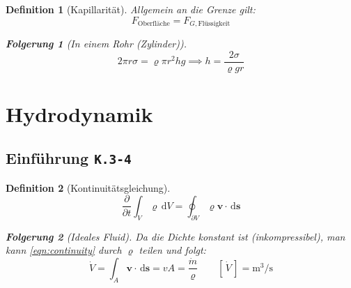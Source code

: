 \documentclass[a4paper, twocolumn]{article}
\numberwithin{equation}{section}
\theoremstyle{hsr-def}
\newtheorem{definition}{Definition}[section]
\theoremstyle{hsr-sub}
\newtheorem{result}{Folgerung}[definition]
\newtheorem{remark}{Bemerkung}[definition]
\newcommand{\dd}[1]{\ensuremath{\mathrm{d}#1}}
\newcommand{\di}[1]{\,\dd{#1}}
\newcommand{\pderiv}[2]{\ensuremath{\frac{\partial #1}{\partial #2}}}
\renewcommand{\vec}[1]{\ensuremath{\mathbf{#1}}}
\newcommand{\unitof}[1]{\ensuremath{\left[\,#1\,\right]}}
\newcommand{\fromlecture}[1]{\textcolor{red!70!black}{\small\texttt{K.#1}}}
\begin{document}
\begin{definition}[Kapillarit\"at]
Allgemein an die Grenze gilt:
\[
    F_\text{Oberfl\"ache} = F_{G,\text{Fl\"ussigkeit}}
\]
\begin{result}[In einem Rohr (Zylinder)]
\[
    2\pi r\sigma = \varrho\pi r^2 hg \implies  h = \frac{2\sigma}{\varrho g r}
\]
\end{result}
\end{definition}

\section{Hydrodynamik}
\subsection{Einf\"uhrung \fromlecture{3-4}}
\begin{definition}[Kontinuit\"atsgleichung]
\begin{equation} \label{eqn:continuity}
    \pderiv{}{t}\int_V \varrho \di{V} 
    = \oint_{\partial V} \varrho \vec{v}\cdot\di{\vec{s}}
\end{equation}

\begin{result}[Ideales Fluid]
Da die Dichte konstant ist (inkompressibel), man kann \eqref{eqn:continuity} durch \(\varrho\) teilen und folgt:
\[
    \dot{V} = \int_A \vec{v}\cdot\di{\vec{s}} 
    = vA = \frac{\dot{m}}{\varrho}
    \qquad
    \unitof{\dot{V}} = \si{\cubic\metre\per\second}
\]
\end{result}

\end{definition}
\end{document}
